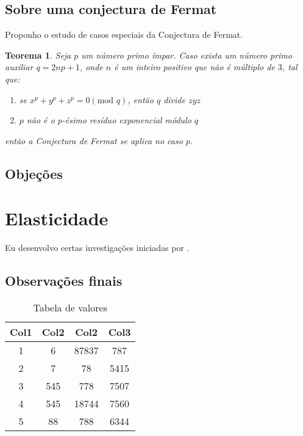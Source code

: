 \documentclass[12pt,tcc,abnt,latin,english,brazil]{df-ufpb}
\newtheorem{theorem}{Teorema}[section]
\begin{document}
\lipsum[1-2]

\section{Sobre uma conjectura de Fermat}
Proponho o estudo de casos especiais da Conjectura de Fermat.

\begin{theorem}
  Seja $p$ um número primo ímpar. Caso exista um número primo auxiliar $q = 2np +1$, onde $n$ é um inteiro positivo que não é múltiplo de $3$, tal que:
  \begin{enumerate}
  \item se $x^{p} + y^{p} + z^{p} = 0 (\text{mod } q)$, então $q$ divide $zyz$
  \item $p$ não é o $p$-ésimo resíduo exponencial módulo $q$
  \end{enumerate}
  então a Conjectura de Fermat se aplica no caso $p$.
\end{theorem}

\lipsum[5-6]
\begin{quote}
  \lipsum[8-9]
  \autocite{ciceroFBM}
\end{quote}

\lipsum[1]

\section{Objeções}

\lipsum[7-9]

\chapter{Elasticidade}

Eu desenvolvo certas investigações iniciadas por \textcite{lagrangeO}.

\section{Observações finais}
\lipsum[1-7]

\begin{table}
  \centering
  \begin{tabular}{||c c c c||} 
    \hline
    Col1 & Col2 & Col2 & Col3 \\ [0.5ex] 
    \hline\hline
    1 & 6 & 87837 & 787 \\ 
    \hline
    2 & 7 & 78 & 5415 \\
    \hline
    3 & 545 & 778 & 7507 \\
    \hline
    4 & 545 & 18744 & 7560 \\
    \hline
    5 & 88 & 788 & 6344 \\ [1ex] 
    \hline
  \end{tabular}

  \caption{Tabela de valores}
\end{table}

\lipsum[1-3]

\printbibliography[heading=bibintoc,title=\bibname]{}
\end{document}
